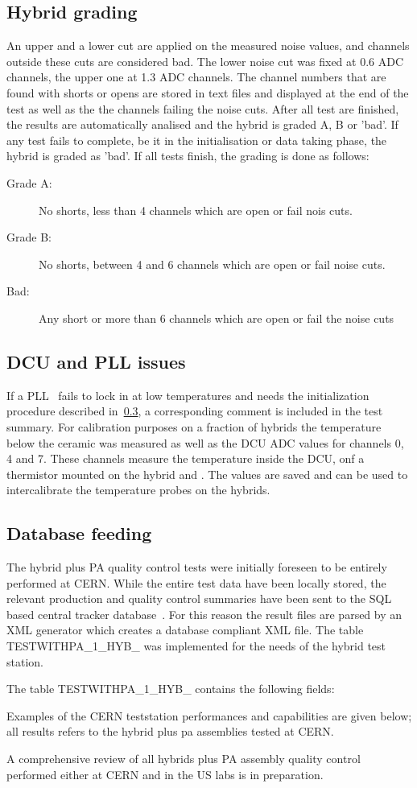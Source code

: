 \subsection{Hybrid grading}
An upper and a lower cut are applied on the measured noise values, and channels outside these cuts are considered bad.
The lower noise cut was fixed at 0.6 ADC channels, the upper one at 1.3 ADC channels.
The channel numbers that are found with shorts or opens are stored in text files and displayed at the end of the test as well as the the channels failing the noise cuts.
After all test are finished, the results are automatically analised and the hybrid is graded A, B or 'bad'.
If any test fails to complete, be it in the initialisation or data taking phase, the hybrid is graded as 'bad'.
If all tests finish, the grading is done as follows:
\begin{description}
\item[Grade A:] No shorts, less than 4 channels which are open or fail nois cuts.
\item[Grade B:] No shorts, between 4 and 6 channels which are open or fail noise cuts.
\item[Bad:] Any short or more than 6 channels which are open or fail the noise cuts
\end{description}

\subsection{DCU and PLL issues}
If a PLL~\cite{pll, pllmanual} fails to lock in at low temperatures and needs the initialization procedure described in~\ref{}, a corresponding comment is included in the test summary.
For calibration purposes on a fraction of hybrids the temperature below the ceramic was measured as well as the DCU ADC values for channels 0, 4 and 7. These channels measure the temperature inside the DCU, onf a thermistor mounted on the hybrid and \fixme. The values are saved and can be used to intercalibrate the temperature probes on the hybrids.

\subsection{Database feeding}
The hybrid plus PA quality control tests were initially foreseen to be entirely performed at CERN.
While the entire test data have been locally stored, the relevant production and quality control summaries have been sent to the SQL based central tracker database~\cite{db}. For this reason the result files are parsed by an XML generator which creates a database compliant XML file. The table TESTWITHPA\_1\_HYB\_ was implemented for the needs of the hybrid test station.

The table TESTWITHPA\_1\_HYB\_ contains the following fields:


Examples of the CERN teststation performances and capabilities are given below; all results refers to the hybrid plus pa assemblies tested at CERN.

{\fixme} A comprehensive review of all hybrids plus PA assembly quality control performed either at CERN and in the US labs is in preparation.
